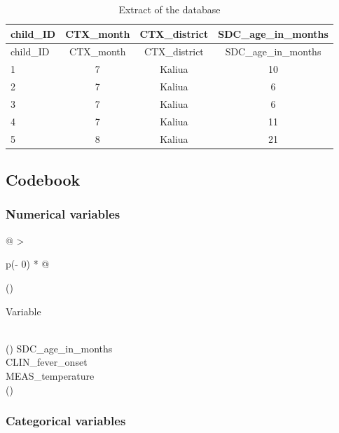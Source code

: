 \documentclass[
  letterpaper,
  DIV=11,
  numbers=noendperiod,
  oneside]{scrreprt}
\begin{document}
\begin{longtable}[]{@{}lccc@{}}
\caption{Extract of the database}\tabularnewline
\toprule()
child\_ID & CTX\_month & CTX\_district & SDC\_age\_in\_months \\
\midrule()
\endfirsthead
\toprule()
child\_ID & CTX\_month & CTX\_district & SDC\_age\_in\_months \\
\midrule()
\endhead
1 & 7 & Kaliua & 10 \\
2 & 7 & Kaliua & 6 \\
3 & 7 & Kaliua & 6 \\
4 & 7 & Kaliua & 11 \\
5 & 8 & Kaliua & 21 \\
\bottomrule()
\end{longtable}

\hypertarget{codebook-3}{%
\subsection{Codebook}\label{codebook-3}}

\hypertarget{numerical-variables}{%
\subsubsection{Numerical variables}\label{numerical-variables}}

\begin{longtable}[]{@{}
  >{\raggedright\arraybackslash}p{(\columnwidth - 0\tabcolsep) * }@{}}
\toprule()
\begin{minipage}[b]{\linewidth}\raggedright
Variable
\end{minipage} \\
\midrule()
\endhead
SDC\_age\_in\_months \\
CLIN\_fever\_onset \\
MEAS\_temperature \\
\bottomrule()
\end{longtable}

\hypertarget{categorical-variables}{%
\subsubsection{Categorical variables}\label{categorical-variables}}
\end{document}

